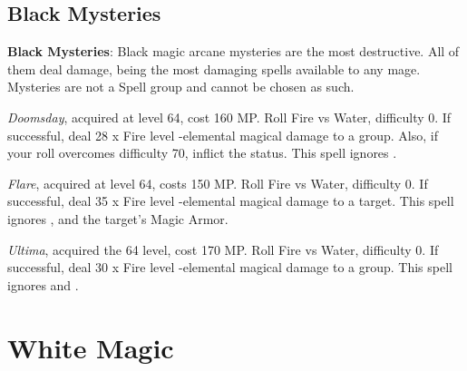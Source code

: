 \begin{multicols}{2}
    \subsection{Black Mysteries}\label{subsec:black-mysteries}

    \textbf{Black Mysteries}: Black magic arcane mysteries are the most destructive. All of them deal damage, being the most damaging spells available to any mage. Mysteries are not a Spell group and cannot be chosen as such.
    
    \textit{Doomsday}, acquired at level 64, cost 160 MP\@. Roll Fire vs Water, difficulty 0. If successful, deal 28 x Fire level -elemental magical damage to a group. Also, if your roll overcomes difficulty 70, inflict the  status. This spell ignores .
    
    \textit{Flare}, acquired at level 64, costs 150 MP\@. Roll Fire vs Water, difficulty 0. If successful, deal 35 x Fire level -elemental magical damage to a target. This spell ignores ,  and the target’s Magic Armor.  
    
    \textit{Ultima}, acquired the 64 level, cost 170 MP\@. Roll Fire vs Water, difficulty 0. If successful, deal 30 x Fire level -elemental magical damage to a group. This spell ignores  and . 

\end{multicols}

\section{White Magic}\label{sec:magic-white}

